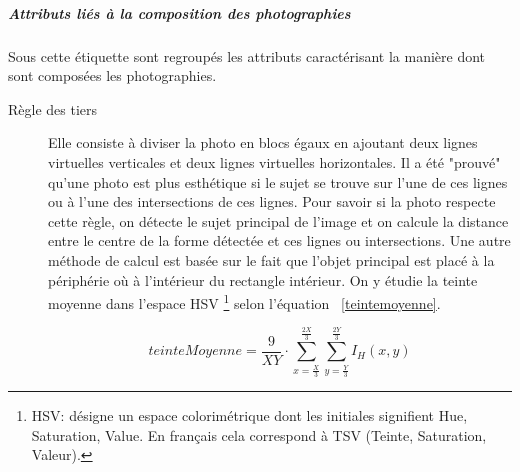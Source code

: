 \documentclass[11pt, french,screen]{report-rd-info}
\begin{document}
\subparagraph{Attributs liés à la composition des photographies}
Sous cette étiquette sont regroupés les attributs caractérisant la manière dont sont composées les photographies. 
\begin{description}
\item[Règle des tiers]
Elle consiste à diviser la photo en blocs égaux en ajoutant deux lignes virtuelles verticales et deux lignes virtuelles horizontales. Il a  été "prouvé" qu’une photo est plus esthétique si le sujet se trouve sur l’une de ces lignes ou à l’une des intersections de ces lignes. Pour savoir si la photo respecte cette règle, on détecte le sujet principal de l’image et on calcule la distance entre le centre de la forme détectée et ces lignes ou intersections. Une autre méthode de calcul est basée sur le fait que l'objet principal est placé à la périphérie où à l'intérieur du rectangle intérieur. On y étudie la teinte moyenne dans l'espace HSV \footnote{HSV: désigne un espace colorimétrique dont les initiales signifient Hue, Saturation, Value. En français cela correspond à TSV (Teinte, Saturation, Valeur).} selon l'équation ~\ref{teintemoyenne}. 

\begin{equation}
teinteMoyenne = \frac{9}{XY}\cdot \sum_{x=\frac{X}{3}}^{\frac{2X}{3}} \sum_{y=\frac{Y}{3}}^{\frac{2Y}{3}} I_H(x,y)
\label{teintemoyenne}
\end{equation}


\end{description}
\end{document}
